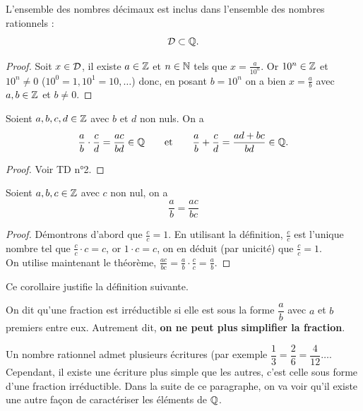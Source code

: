 \documentclass[a4paper, 12pt]{report}
\begin{document}
\begin{prop}
L'ensemble des nombres décimaux est inclus dans l'ensemble des nombres rationnels :
\[ \mathcal{D} \subset \mathbb{Q}. \]
\end{prop}

\begin{proof}
Soit $x \in \mathcal{D}$, il existe $a \in \mathbb{Z}$ et $n \in \mathbb{N}$ tels que $x = \frac{a}{10^n}$. Or $10^n \in \mathbb{Z}$ et $10^n \neq 0$ ($10^0 = 1, 10^1 = 10, \dots$) donc, en posant $b=10^n$ on a bien $x=\frac{a}{b}$ avec $a, b \in \mathbb{Z}$ et $b \neq 0$.
\end{proof}

\begin{thm}
Soient $a, b, c ,d \in \mathbb{Z}$ avec $b$ et $d$ non nuls. On a 
\[ \frac{a}{b} \cdot \frac{c}{d}  = \frac{ac}{bd} \in \mathbb{Q} \qquad \text{et} \qquad \frac{a}{b} + \frac{c}{d} = \frac{ad + bc}{bd} \in \mathbb{Q}. \]
\end{thm}

\begin{proof}
Voir TD n°2.
\end{proof}

\begin{coro}
Soient $a, b , c \in \mathbb{Z}$ avec $c$ non nul, on a
\[ \frac{a}{b} = \frac{ac}{bc} \]
\end{coro}

\begin{proof}
Démontrons d'abord que $\frac{c}{c} = 1$. En utilisant la définition, $\frac{c}{c}$ est l'unique nombre tel que $\frac{c}{c} \cdot c = c$, 
or $1 \cdot c = c$, on en déduit (par unicité) que $\frac{c}{c} = 1$. \\
On utilise maintenant le théorème, $\frac{ac}{bc} = \frac{a}{b} \cdot \frac{c}{c} = \frac{a}{b}$.
\end{proof}

\begin{rmq}
Ce corollaire justifie la définition suivante.
\end{rmq}

\begin{defn}
On dit qu'une fraction est irréductible si elle est sous la forme $\dfrac{a}{b}$ avec $a$ et $b$ premiers entre eux. Autrement dit, \textbf{on ne peut plus simplifier la fraction}.
\end{defn}

\begin{rmq}
Un nombre rationnel admet plusieurs écritures (par exemple $\dfrac13 = \dfrac26 = \dfrac4{12} \dots$. Cependant, il existe une écriture plus simple que les autres, c'est celle sous forme d'une fraction irréductible. Dans la suite de ce paragraphe, on va voir qu'il existe une autre façon de caractériser les éléments de $\mathbb{Q}$.
\end{rmq}
\end{document}
